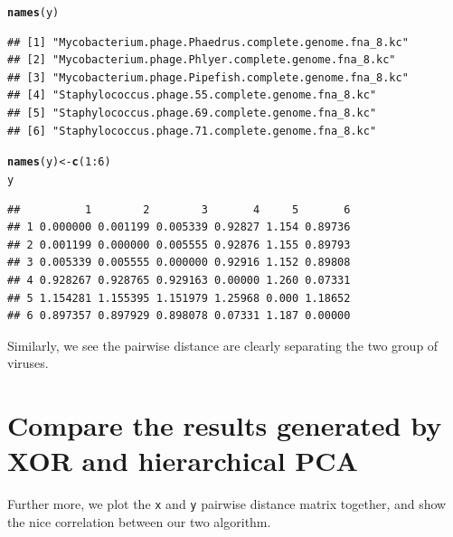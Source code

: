 \documentclass{article}\usepackage[]{graphicx}\usepackage[]{color}
\makeatletter
\newcommand{\hlnum}[1]{\textcolor[rgb]{0.686,0.059,0.569}{#1}}%
\newcommand{\hlopt}[1]{\textcolor[rgb]{0,0,0}{#1}}%
\newcommand{\hlstd}[1]{\textcolor[rgb]{0.345,0.345,0.345}{#1}}%
\newcommand{\hlkwb}[1]{\textcolor[rgb]{0.69,0.353,0.396}{#1}}%
\newcommand{\hlkwd}[1]{\textcolor[rgb]{0.737,0.353,0.396}{\textbf{#1}}}%
\newenvironment{kframe}{%
 \def\at@end@of@kframe{}%
 \ifinner\ifhmode%
  \def\at@end@of@kframe{\end{minipage}}%
  \begin{minipage}{\columnwidth}%
 \fi\fi%
 \def\FrameCommand##1{\hskip\@totalleftmargin \hskip-\fboxsep
 \colorbox{shadecolor}{##1}\hskip-\fboxsep
     \hskip-\linewidth \hskip-\@totalleftmargin \hskip\columnwidth}%
 \MakeFramed {\advance\hsize-\width
   \@totalleftmargin\z@ \linewidth\hsize
   \@setminipage}}%
 {\par\unskip\endMakeFramed%
 \at@end@of@kframe}
\newenvironment{knitrout}{}{} %
\makeatother
\begin{document}
\begin{knitrout}
\color{fgcolor}\begin{kframe}
\begin{alltt}
\hlkwd{names}\hlstd{(y)}
\end{alltt}
\begin{verbatim}
## [1] "Mycobacterium.phage.Phaedrus.complete.genome.fna_8.kc"
## [2] "Mycobacterium.phage.Phlyer.complete.genome.fna_8.kc"  
## [3] "Mycobacterium.phage.Pipefish.complete.genome.fna_8.kc"
## [4] "Staphylococcus.phage.55.complete.genome.fna_8.kc"     
## [5] "Staphylococcus.phage.69.complete.genome.fna_8.kc"     
## [6] "Staphylococcus.phage.71.complete.genome.fna_8.kc"
\end{verbatim}
\begin{alltt}
\hlkwd{names}\hlstd{(y)} \hlkwb{<-} \hlkwd{c}\hlstd{(}\hlnum{1}\hlopt{:}\hlnum{6}\hlstd{)}
\hlstd{y}
\end{alltt}
\begin{verbatim}
##          1        2        3       4     5       6
## 1 0.000000 0.001199 0.005339 0.92827 1.154 0.89736
## 2 0.001199 0.000000 0.005555 0.92876 1.155 0.89793
## 3 0.005339 0.005555 0.000000 0.92916 1.152 0.89808
## 4 0.928267 0.928765 0.929163 0.00000 1.260 0.07331
## 5 1.154281 1.155395 1.151979 1.25968 0.000 1.18652
## 6 0.897357 0.897929 0.898078 0.07331 1.187 0.00000
\end{verbatim}
\end{kframe}
\end{knitrout}

Similarly, we see the pairwise distance are clearly separating the two group of viruses.\\


\section{Compare the results generated by XOR and hierarchical PCA}
\label{kmerDistance.dif}

Further more, we plot the \texttt{x} and \texttt{y} pairwise distance matrix together, and show the nice correlation between our two algorithm.
\end{document}
